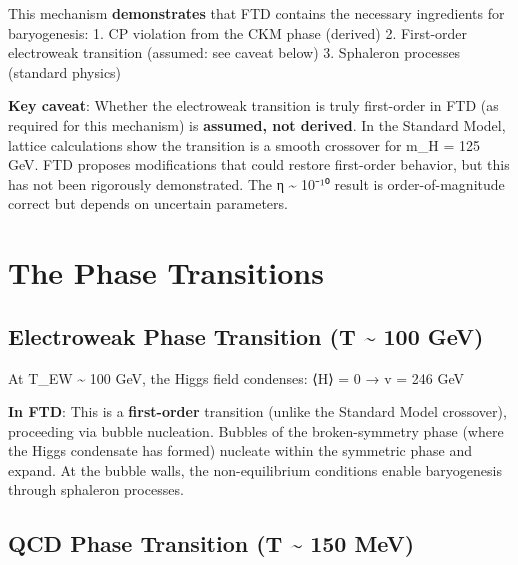 \documentclass[
  11pt,
  letterpaper,
  twoside,
  openright]{book}
\begin{document}
\begin{tcolorbox}[enhanced jigsaw, leftrule=.75mm, title=\textcolor{quarto-callout-warning-color}{\faExclamationTriangle}\hspace{0.5em}{Epistemic Status: Baryogenesis}, bottomrule=.15mm, opacityback=0, coltitle=black, arc=.35mm, colframe=quarto-callout-warning-color-frame, colbacktitle=quarto-callout-warning-color!10!white, colback=white, titlerule=0mm, breakable, bottomtitle=1mm, toptitle=1mm, rightrule=.15mm, toprule=.15mm, left=2mm, opacitybacktitle=0.6]

This mechanism \textbf{demonstrates} that FTD contains the necessary
ingredients for baryogenesis: 1. CP violation from the CKM phase
(derived) 2. First-order electroweak transition (assumed: see caveat
below) 3. Sphaleron processes (standard physics)

\textbf{Key caveat}: Whether the electroweak transition is truly
first-order in FTD (as required for this mechanism) is \textbf{assumed,
not derived}. In the Standard Model, lattice calculations show the
transition is a smooth crossover for m\_H = 125 GeV. FTD proposes
modifications that could restore first-order behavior, but this has not
been rigorously demonstrated. The η \textasciitilde{} 10⁻¹⁰ result is
order-of-magnitude correct but depends on uncertain parameters.

\end{tcolorbox}

\section{The Phase Transitions}\label{the-phase-transitions}

\subsection{Electroweak Phase Transition (T \textasciitilde{} 100
GeV)}\label{electroweak-phase-transition-t-100-gev}

At T\_EW \textasciitilde{} 100 GeV, the Higgs field condenses: ⟨H⟩ = 0 →
v = 246 GeV

\textbf{In FTD}: This is a \textbf{first-order} transition (unlike the
Standard Model crossover), proceeding via bubble nucleation. Bubbles of
the broken-symmetry phase (where the Higgs condensate has formed)
nucleate within the symmetric phase and expand. At the bubble walls, the
non-equilibrium conditions enable baryogenesis through sphaleron
processes.

\subsection{QCD Phase Transition (T \textasciitilde{} 150
MeV)}\label{qcd-phase-transition-t-150-mev}
\end{document}
